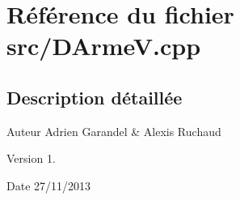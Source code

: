 \section{Référence du fichier src/\-D\-Arme\-V.cpp}
\label{_d_arme_v_8cpp}


\subsection{Description détaillée}
\begin{DoxyAuthor}{Auteur}
Adrien Garandel \& Alexis Ruchaud 
\end{DoxyAuthor}
\begin{DoxyVersion}{Version}
1. 
\end{DoxyVersion}
\begin{DoxyDate}{Date}
27/11/2013 
\end{DoxyDate}
